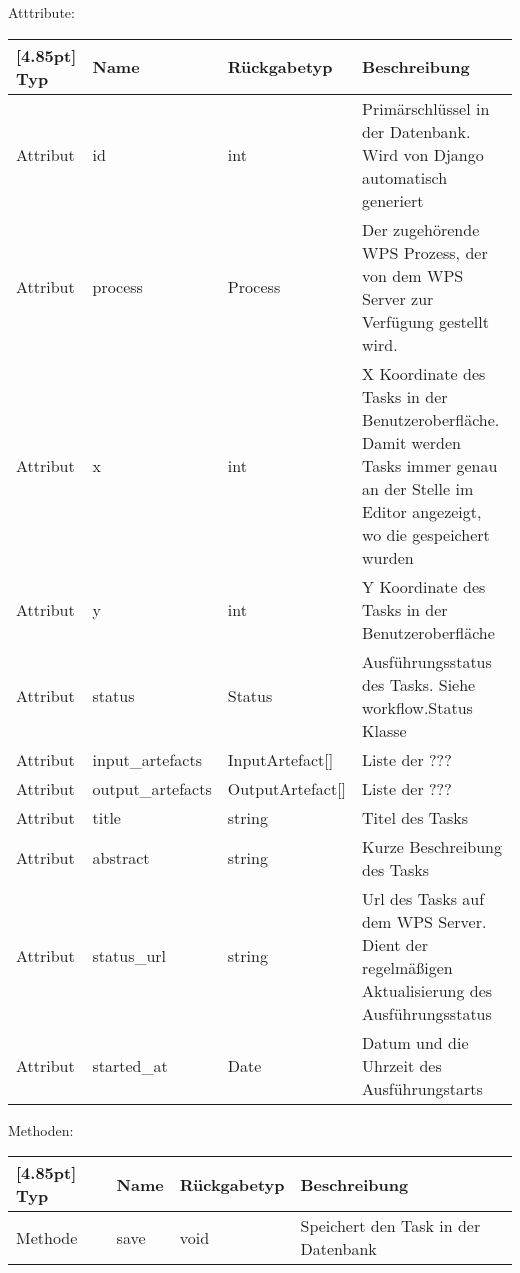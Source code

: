     		Atttribute:
			\begin{center}
				\setlength\tabcolsep{5pt}
				\renewcommand{\arraystretch}{1.5}
				
				\begin{tabularx}{\textwidth}{|l|l|l|X|}
					\hline
					\rowcolor[gray]{0.75}[4.85pt]
					Typ & Name & Rückgabetyp & Beschreibung \\ \hline 
	           		Attribut & id & int & Primärschlüssel in der Datenbank. Wird von Django automatisch generiert \\ \hline
	           		Attribut & process & Process & Der zugehörende WPS Prozess, der von dem WPS Server zur Verfügung gestellt wird. \\\hline
	           		Attribut & x & int & X Koordinate des Tasks in der Benutzeroberfläche. Damit werden Tasks immer genau an der Stelle im Editor angezeigt, wo die gespeichert wurden\\ \hline
	           		Attribut & y & int & Y Koordinate des Tasks in der Benutzeroberfläche\\ \hline
	           		Attribut & status & Status & Ausführungsstatus des Tasks. Siehe workflow.Status Klasse \\ \hline
	           		Attribut & input\_artefacts & InputArtefact[] & Liste der ??? \\ \hline
	           		Attribut & output\_artefacts & OutputArtefact[] & Liste der ??? \\ \hline
	           		Attribut & title & string & Titel des Tasks \\ \hline
	           		Attribut & abstract & string & Kurze Beschreibung des Tasks \\ \hline
	           		Attribut & status\_url & string & Url des Tasks auf dem WPS Server. Dient der  regelmäßigen Aktualisierung des Ausführungsstatus \\ \hline
	           		Attribut & started\_at & Date & Datum und die Uhrzeit des Ausführungstarts \\ \hline
				\end{tabularx}
			\end{center}
    			
			Methoden:
			\begin{center}
				\setlength\tabcolsep{5pt}
				\renewcommand{\arraystretch}{1.5}
				
				\begin{tabularx}{\textwidth}{|l|l|l|X|}
					\hline
					\rowcolor[gray]{0.75}[4.85pt]
					Typ & Name & Rückgabetyp & Beschreibung \\ \hline
					Methode & save & void & Speichert den Task in der Datenbank \\ 
					\hline
				\end{tabularx}
			\end{center}			
